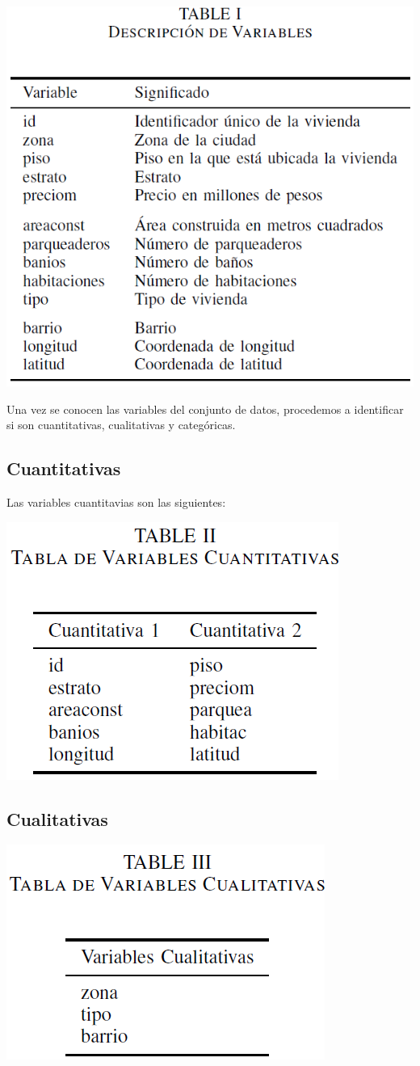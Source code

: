 \documentclass[conference,final,]{IEEEtran}
\begin{document}
\begin{center}\includegraphics[width=0.7\linewidth]{images/Tabla1} \end{center}

Una vez se conocen las variables del conjunto de datos, procedemos a
identificar si son cuantitativas, cualitativas y categóricas.

\subsection{\textbf{Cuantitativas}}

Las variables cuantitavias son las siguientes:

\begin{center}\includegraphics[width=0.6\linewidth]{images/Tabla2} \end{center}

\subsection{\textbf{Cualitativas}}

\begin{center}\includegraphics[width=0.6\linewidth]{images/Tabla3} \end{center}
\end{document}
